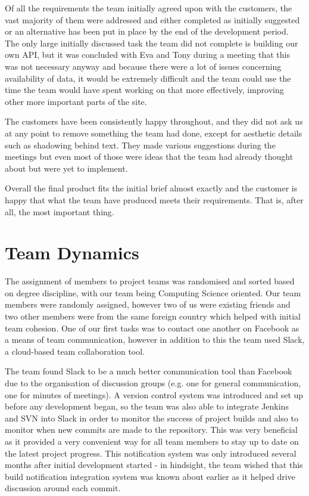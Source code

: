 \documentclass{l3proj}
\begin{document}

Of all the requirements the team initially agreed upon with the customers, the vast majority of them were addressed and either completed as initially suggested or an alternative has been put in place by the end of the development period. The only large initially discussed task the team did not complete is building our own API, but it was concluded with Eva and Tony during a meeting that this was not necessary anyway and because there were a lot of issues concerning availability of data, it would be extremely difficult and the team could use the time the team would have spent working on that more effectively, improving other more important parts of the site.

The customers have been consistently happy throughout, and they did not ask us at any point to remove something the team had done, except for aesthetic details such as shadowing behind text. They made various suggestions during the meetings but even most of those were ideas that the team had already thought about but were yet to implement.

Overall the final product fits the initial brief almost exactly and the customer is happy that what the team have produced meets their requirements. That is, after all, the most important thing.

\section{Team Dynamics}
\label{sec:team-dynamics}

The assignment of members to project teams was randomised and sorted based on degree discipline, with our team being Computing Science oriented. Our team members were randomly assigned, however two of us were existing friends and two other members were from the same foreign country which helped with initial team cohesion. One of our first tasks was to contact one another on Facebook as a means of team communication, however in addition to this the team used Slack, a cloud-based team collaboration tool.

The team found Slack to be a much better communication tool than Facebook due to the organisation of discussion groups (e.g. one for general communication, one for minutes of meetings). A version control system was introduced and set up before any development began, so the team was also able to integrate Jenkins and SVN into Slack in order to monitor the success of project builds and also to monitor when new commits are made to the repository. This was very beneficial as it provided a very convenient way for all team members to stay up to date on the latest project progress. This notification system was only introduced several months after initial development started - in hindsight, the team wished that this build notification integration system was known about earlier as it helped drive discussion around each commit.
\end{document}
